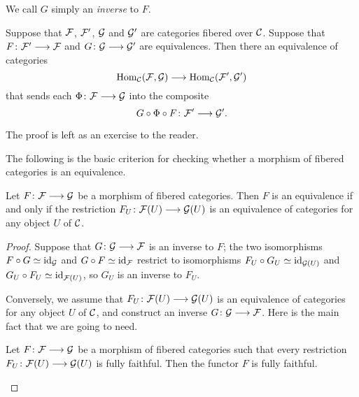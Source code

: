 \begin{3   FIBERED CATEGORIES}
\begin{3.5 Equivalences of fibered categories}
\begin{definition}
We call $G$ simply an \emph{inverse} to $F$.
\end{definition}

\begin{proposition}\label{prop:equiv->equivalenthom}
Suppose that $\mathcal{F}$, $\mathcal{F}'$, $\mathcal{G}$ and $\mathcal{G}'$ are categories fibered over $\mathcal{C}$. Suppose  that $F \colon \cF' \arr \cF$ and $G \colon \cG \arr \cG'$ are equivalences. Then there an equivalence of categories
   \[
   \hom_{\cC}(\cF, \cG) \arr
   \hom_{\cC}(\cF', \cG')
   \]
that sends each $\Phi \colon \cF \arr \cG$ into the composite
   \[
   G \circ \Phi \circ F \colon \cF' \arr \cG'.
   \]
\end{proposition}

The proof is left as an exercise to the reader.

The following is the basic criterion for checking whether a morphism of fibered categories is an equivalence.

\begin{proposition}\label{prop:char-equivalence} Let $F \colon \cF \arr \cG$ be a morphism of fibered categories. Then $F$ is an equivalence if and only if the restriction $F_U \colon \cF(U) \arr \cG(U)$ is an equivalence of categories for any object $U$ of $\mathcal{C}$.
\end{proposition}

\begin{proof} Suppose that $G \colon \cG \arr \cF$ is an inverse to $F$; the two isomorphisms $F \circ G\simeq \mathrm{id}_{\mathcal{G}}$ and $G \circ F\simeq \mathrm{id}_{\mathcal{F}}$  restrict to isomorphisms $F_U \circ G_U\simeq \mathrm{id}_{\mathcal{G}(U)}$ and $G_U \circ F_U\simeq \mathrm{id}_{\mathcal{F}(U)}$, so $G_U$ is an inverse to $F_U$.

Conversely, we assume that $F_U \colon \cF(U) \arr \cG(U)$ is an equivalence of categories for any object $U$ of $\mathcal{C}$, and construct an inverse $G \colon \cG \arr \cF$. Here is the main fact that we are going to need.

\begin{lemma}\label{lem:fully-fibered} Let $F \colon \cF \arr \cG$ be a morphism of fibered categories such that every restriction $F_U \colon \cF(U) \arr \cG(U)$ is fully faithful. Then the functor $F$ is fully faithful.
\end{lemma}


\end{proof}
\end{3.5 Equivalences of fibered categories}
\end{3   FIBERED CATEGORIES}
